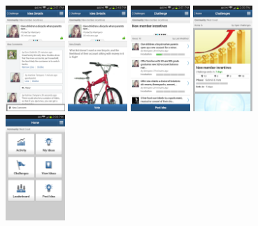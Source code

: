 \begin{figure}[!h]
	\begin{center}
		\includegraphics[width=0.2\textwidth]{./img/competencia/spigit/1.png}
		\includegraphics[width=0.2\textwidth]{./img/competencia/spigit/2.png}
		\includegraphics[width=0.2\textwidth]{./img/competencia/spigit/3.png}
		\includegraphics[width=0.2\textwidth]{./img/competencia/spigit/4.png}
		\includegraphics[width=0.2\textwidth]{./img/competencia/spigit/5.png}

\end{center}
\end{figure}
